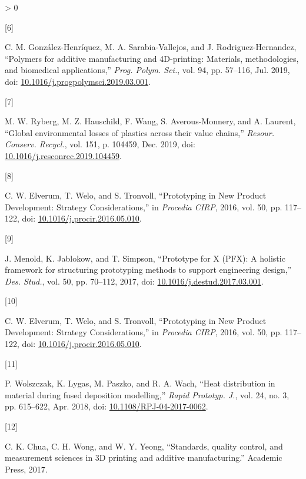 \documentclass[conference,final,]{IEEEtran}
\newlength{\csllabelwidth}
\newlength{\cslhangindent}
\newenvironment{CSLReferences}[3] %
 {%
  \setlength{\parindent}{0pt}
  \ifodd #1 \everypar{\setlength{\hangindent}{\cslhangindent}}\ignorespaces\fi
  \ifnum #2 > 0
  \setlength{\parskip}{#2\baselineskip}
  \fi
 }%
 {}
\newcommand{\CSLLeftMargin}[1]{\parbox[t]{\csllabelwidth}{#1}}
\newcommand{\CSLRightInline}[1]{\parbox[t]{\linewidth - \csllabelwidth}{#1}}
\begin{document}
\begin{CSLReferences}{0}{0}
\leavevmode\hypertarget{ref-GonzalezHenriquez2019}{}%
\CSLLeftMargin{{[}6{]} }
\CSLRightInline{C. M. González-Henríquez, M. A. Sarabia-Vallejos, and J.
Rodriguez-Hernandez, {``{Polymers for additive manufacturing and
4D-printing: Materials, methodologies, and biomedical applications},''}
\emph{Prog. Polym. Sci.}, vol. 94, pp. 57--116, Jul. 2019, doi:
\href{https://doi.org/10.1016/j.progpolymsci.2019.03.001}{10.1016/j.progpolymsci.2019.03.001}.}

\leavevmode\hypertarget{ref-Ryberg2019}{}%
\CSLLeftMargin{{[}7{]} }
\CSLRightInline{M. W. Ryberg, M. Z. Hauschild, F. Wang, S.
Averous-Monnery, and A. Laurent, {``{Global environmental losses of
plastics across their value chains},''} \emph{Resour. Conserv. Recycl.},
vol. 151, p. 104459, Dec. 2019, doi:
\href{https://doi.org/10.1016/j.resconrec.2019.104459}{10.1016/j.resconrec.2019.104459}.}

\leavevmode\hypertarget{ref-Elverum2016a}{}%
\CSLLeftMargin{{[}8{]} }
\CSLRightInline{C. W. Elverum, T. Welo, and S. Tronvoll, {``{Prototyping
in New Product Development: Strategy Considerations},''} in
\emph{Procedia CIRP}, 2016, vol. 50, pp. 117--122, doi:
\href{https://doi.org/10.1016/j.procir.2016.05.010}{10.1016/j.procir.2016.05.010}.}

\leavevmode\hypertarget{ref-Menold2017}{}%
\CSLLeftMargin{{[}9{]} }
\CSLRightInline{J. Menold, K. Jablokow, and T. Simpson, {``{Prototype
for X (PFX): A holistic framework for structuring prototyping methods to
support engineering design},''} \emph{Des. Stud.}, vol. 50, pp. 70--112,
2017, doi:
\href{https://doi.org/10.1016/j.destud.2017.03.001}{10.1016/j.destud.2017.03.001}.}

\leavevmode\hypertarget{ref-Elverum2016}{}%
\CSLLeftMargin{{[}10{]} }
\CSLRightInline{C. W. Elverum, T. Welo, and S. Tronvoll, {``{Prototyping
in New Product Development: Strategy Considerations},''} in
\emph{Procedia CIRP}, 2016, vol. 50, pp. 117--122, doi:
\href{https://doi.org/10.1016/j.procir.2016.05.010}{10.1016/j.procir.2016.05.010}.}

\leavevmode\hypertarget{ref-Wolszczak2018}{}%
\CSLLeftMargin{{[}11{]} }
\CSLRightInline{P. Wolszczak, K. Lygas, M. Paszko, and R. A. Wach,
{``{Heat distribution in material during fused deposition modelling},''}
\emph{Rapid Prototyp. J.}, vol. 24, no. 3, pp. 615--622, Apr. 2018, doi:
\href{https://doi.org/10.1108/RPJ-04-2017-0062}{10.1108/RPJ-04-2017-0062}.}

\leavevmode\hypertarget{ref-Chua2017}{}%
\CSLLeftMargin{{[}12{]} }
\CSLRightInline{C. K. Chua, C. H. Wong, and W. Y. Yeong, {``{Standards,
quality control, and measurement sciences in 3D printing and additive
manufacturing}.''} Academic Press, 2017.}


\end{CSLReferences}
\end{document}

